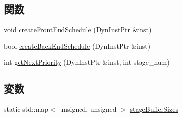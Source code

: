\subsection*{関数}
\begin{DoxyCompactItemize}
\item 
void \hyperlink{namespaceThePipeline_a47c8cbd46bfdf2ebcec1d556e7bcea01}{createFrontEndSchedule} (DynInstPtr \&inst)
\item 
bool \hyperlink{namespaceThePipeline_abea63cbb0df7d307fa9c239e6fea49e5}{createBackEndSchedule} (DynInstPtr \&inst)
\item 
int \hyperlink{namespaceThePipeline_ac700a8f16a36e0276ea60791d35dbcc2}{getNextPriority} (DynInstPtr \&inst, int stage\_\-num)
\end{DoxyCompactItemize}
\subsection*{変数}
\begin{DoxyCompactItemize}
\item 
static std::map$<$ unsigned, unsigned $>$ \hyperlink{namespaceThePipeline_a051ec84638cf1b284185a59bae1a5338}{stageBufferSizes}
\end{DoxyCompactItemize}
